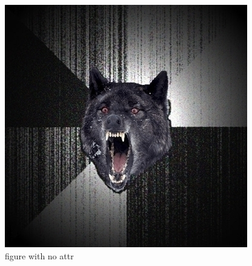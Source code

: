 \begin{figure}[htbp]
\centering
\includegraphics{image.png}
\caption{figure with no attr}
\end{figure}
